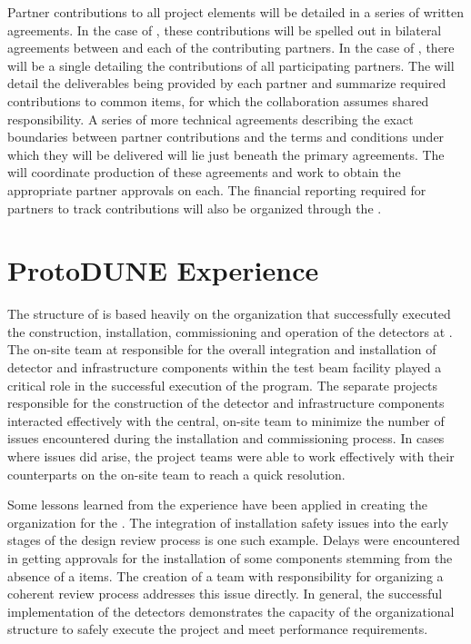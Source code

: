 Partner contributions to all project elements will be detailed in a
series of written agreements.  In the case of , these
contributions will be spelled out in bilateral agreements between
 and each of the contributing partners.  In the case of
, there will be a single  
detailing the contributions of all participating partners.  The  
will detail the deliverables being provided by each partner and
summarize required contributions to common items, for which the
collaboration assumes shared responsibility.  A series of more
technical agreements describing the exact boundaries between partner
contributions and the terms and conditions under which they will be
delivered will lie just beneath the primary agreements.  The
 will coordinate production of these agreements and work to
obtain the appropriate partner approvals %
on each.  The financial
reporting required for partners to track  contributions
will also be organized through the .

\section{ProtoDUNE Experience}
\label{sec:dune_protodune}

The structure of  is based heavily on the
organization that successfully executed the construction,
installation, commissioning and operation of the 
detectors at .  The on-site team at  responsible for the
overall integration and installation of detector and infrastructure
components within the test beam facility played a critical role in the
successful execution of the  program.  The separate
projects responsible for the construction of the detector and
infrastructure components interacted effectively with the central,
on-site team to minimize the number of issues encountered during the
installation and commissioning process.  In cases where issues did
arise, the project teams were able to work effectively with their
counterparts on the on-site team to reach a quick resolution.

Some lessons learned from the  experience have been
applied in creating the  organization for the
 .  The integration of installation safety
issues into the early stages of the design review process is one such
example.  Delays were encountered in getting approvals for the
installation of some  components stemming from the absence
of a %
items.  The creation of a  team with responsibility for
organizing a coherent review process addresses this issue directly.
In general, the successful implementation of the 
detectors demonstrates the capacity of the organizational structure to
safely execute the project and meet performance requirements.
